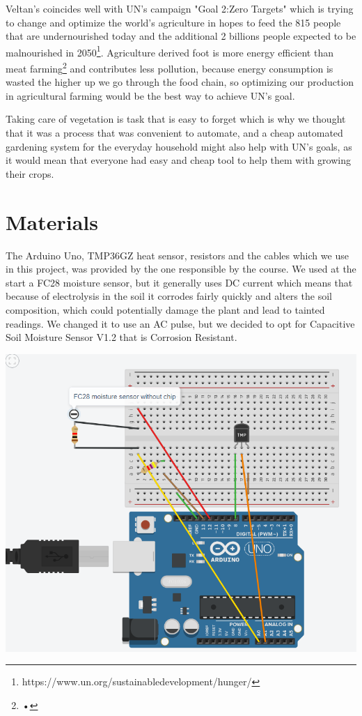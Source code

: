 \documentclass{article}
\begin{document}
Veltan's coincides well with UN's campaign "Goal 2:Zero Targets" which is trying to change and optimize the world's agriculture in hopes to feed the 815 people that are undernourished today and the additional 2 billions people expected to be malnourished in 2050\footnote{https://www.un.org/sustainabledevelopment/hunger/}. Agriculture derived foot is more energy efficient than meat farming\footnote{•} and contributes less pollution, because energy consumption is wasted the higher up we go through the food chain, so optimizing our production in agricultural farming would be the best way to achieve UN's goal.

Taking care of vegetation is task that is easy to forget which is why we thought that it was a process that was convenient to automate, and a cheap automated gardening system for the everyday household might also help with UN's goals, as it would mean that everyone had easy and cheap tool to help them with growing their crops.

\section{Materials}
The Arduino Uno, TMP36GZ heat sensor, resistors and the cables which we use in this project, was provided by the one responsible by the course. We used at the start a FC28 moisture sensor, but it generally uses DC current which means that because of electrolysis in the soil it corrodes fairly quickly and alters the soil composition, which could potentially damage the plant and lead to tainted readings. We changed it to use an AC pulse, but we decided to opt for Capacitive Soil Moisture Sensor V1.2 that is Corrosion Resistant.


\includegraphics[scale = 0.50]{FC-28-Diagram.PNG}
\end{document}
